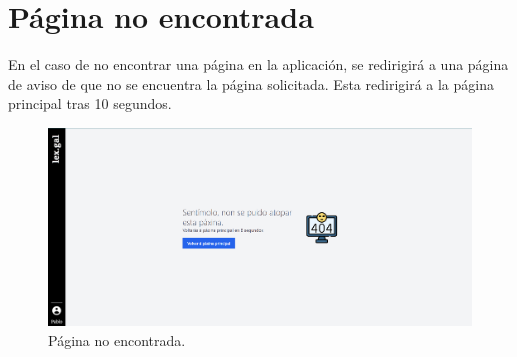\section{Página no encontrada}
\label{PNoEncontrada}

En el caso de no encontrar una página en la aplicación, se redirigirá a una página de aviso de que no se encuentra la página solicitada. Esta redirigirá a la página principal tras 10 segundos.

\begin{figure}[H]
\centerline{\includegraphics[width=15cm]{figuras/manualUsuario/NoEncontrada.PNG}}
\caption{Página no encontrada.}
\label{enlaceNoEncontrada}
\end{figure}